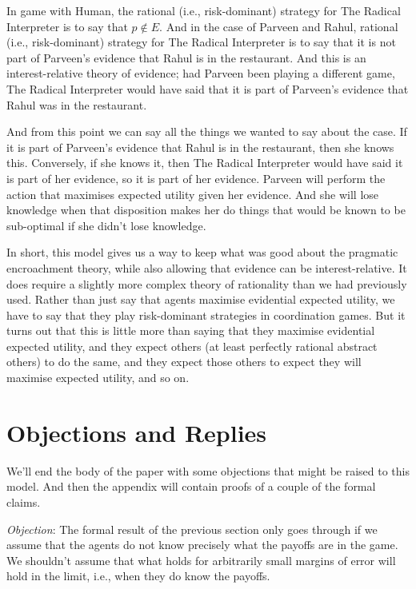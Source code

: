 \documentclass{article}
\begin{document}
In game with Human, the rational (i.e., risk-dominant) strategy for The Radical Interpreter is to say that $p \notin E$. And in the case of Parveen and Rahul, rational (i.e., risk-dominant) strategy for The Radical Interpreter is to say that it is not part of Parveen's evidence that Rahul is in the restaurant. And this is an interest-relative theory of evidence; had Parveen been playing a different game, The Radical Interpreter would have said that it is part of Parveen's evidence that Rahul was in the restaurant. 

And from this point we can say all the things we wanted to say about the case. If it is part of Parveen's evidence that Rahul is in the restaurant, then she knows this. Conversely, if she knows it, then The Radical Interpreter would have said it is part of her evidence, so it is part of her evidence. Parveen will perform the action that maximises expected utility given her evidence. And she will lose knowledge when that disposition makes her do things that would be known to be sub-optimal if she didn't lose knowledge.

In short, this model gives us a way to keep what was good about the pragmatic encroachment theory, while also allowing that evidence can be interest-relative. It does require a slightly more complex theory of rationality than we had previously used. Rather than just say that agents maximise evidential expected utility, we have to say that they play risk-dominant strategies in coordination games. But it turns out that this is little more than saying that they maximise evidential expected utility, and they expect others (at least perfectly rational abstract others) to do the same, and they expect those others to expect they will maximise expected utility, and so on.

\section{Objections and Replies}
\label{objectionsandreplies}

We'll end the body of the paper with some objections that might be raised to this model. And then the appendix will contain proofs of a couple of the formal claims.

\emph{Objection}: The formal result of the previous section only goes through if we assume that the agents do not know precisely what the payoffs are in the game. We shouldn't assume that what holds for arbitrarily small margins of error will hold in the limit, i.e., when they do know the payoffs.
\end{document}
